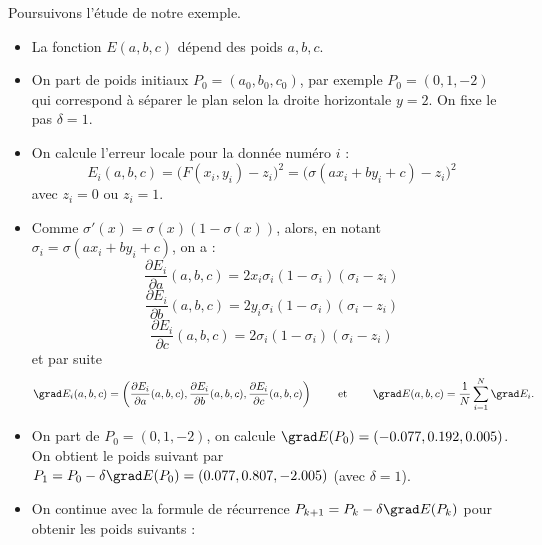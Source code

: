 \begin{exemple}{}{}
	Poursuivons l'étude de notre exemple.
	\begin{itemize}
		\item La fonction $E(a,b,c)$ dépend des poids $a,b,c$.
		
		\item On part de poids initiaux $P_0 = (a_0,b_0,c_0)$, par exemple $P_0 = (0,1,-2)$ qui correspond à séparer le plan selon la droite horizontale $y=2$. 
		On fixe le pas $\delta = 1$.
		
		\item On calcule l'erreur locale pour la donnée numéro $i$ :
		$$E_i(a,b,c) = \big( F(x_i,y_i) - z_i \big)^2 = \big( \sigma(ax_i + by_i + c) - z_i \big)^2$$
		avec $z_i = 0$ ou $z_i=1$.
		
		\item Comme $\sigma'(x)= \sigma(x)(1-\sigma(x))$, alors, en notant $\sigma_i = \sigma(ax_i+by_i+c)$, on a :
		$$\frac{\partial E_i}{\partial a}(a,b,c) = 2 x_i  \sigma_i(1-\sigma_i)(\sigma_i - z_i)$$
		$$\frac{\partial E_i}{\partial b}(a,b,c) = 2 y_i \sigma_i(1-\sigma_i)(\sigma_i - z_i)$$
		$$\frac{\partial E_i}{\partial c}(a,b,c) = 2 \sigma_i(1-\sigma_i)(\sigma_i - z_i)$$ 
		et par suite 
		{\small
			$$\grad E_i(a,b,c) = \left(\frac{\partial E_i}{\partial a}(a,b,c), \frac{\partial E_i}{\partial b}(a,b,c), \frac{\partial E_i}{\partial c}(a,b,c) \right)
			\qquad \text{ et  } \qquad 
			\grad E(a,b,c) = \frac 1N \sum_{i=1}^N \grad E_i.$$
		}
		
		\item On part de $P_0 = (0,1,-2)$, on calcule $\grad E(P_0) = (-0.077, 0.192, 0.005)$. On obtient le poids suivant par $P_1 = P_0 - \delta \grad E(P_0) = (0.077,    0.807,    -2.005)$ (avec $\delta = 1$).   
		
		\item On continue avec la formule de récurrence $P_{k+1} = P_k - \delta \grad E(P_k)$ pour obtenir les poids suivants :
		

\end{itemize}
\end{exemple}
